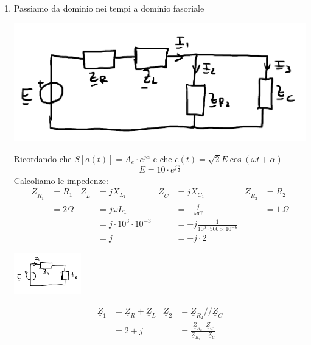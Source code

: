 \documentclass{article}
\begin{document}
\begin{enumerate}[label=\protect\circled{\arabic*}]
    \item Passiamo da dominio nei tempi a dominio fasoriale
    \begin{center}
        \includegraphics[scale=0.26]{Image/Es_Regime_Sinusoiudale_2_1.png}
    \end{center}
    Ricordando che $S[a(t)]=A_e \cdot e^{j \alpha}$ e che $e(t) = \sqrt{2} E \cos(\omega t + \alpha)$
    \[\underline{E}=10 \cdot e^{j \frac{\pi}{2}}\]
    Calcoliamo le impedenze:
    \begin{align*}
        \underline{Z}_{R_1} &= R_1 & 
        \underline{Z}_{L} &= j X_{L_1}&
        \underline{Z}_C &= j X_{C_1} &
        \underline{Z}_{R_2} &= R_2
        \\
        &=2 \Omega & 
        &=j \omega L_1 & 
        &=-\frac{j}{\omega C} &
        &= 1 \ \Omega
        \\
        & & 
        &= j \cdot 10^3 \cdot 10^{-3} &
        &= - j \frac{1}{10^3 \cdot 500 \times 10^{-6}} 
        \\
        & & 
        &= j &
        &= -j \cdot 2
    \end{align*}
    \begin{center}
        \includegraphics[width=0.23\textwidth]{Image/Es_Regime_Sinusoiudale_2_2.png}
    \end{center}
    \leavevmode
    \begin{align*}
        \underline{Z}_{1} &= \underline{Z}_R + \underline{Z}_L &
        \underline{Z}_{2} &= \underline{Z}_{R_2} // \underline{Z}_C
        \\
        &= 2 + j &
        &= \frac{\underline{Z}_{R_2} \cdot \underline{Z}_C}{\underline{Z}_{R_2} + \underline{Z}_C}

\end{align*}
\end{enumerate}
\end{document}
